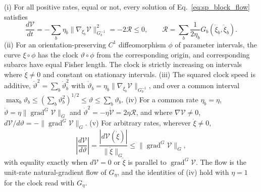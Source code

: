 \begin{proposition}\label{prop:sp_block_descent}
(i) For all positive rates, equal or not, every solution of Eq.~\eqref{eq:sp_block_flow} satisfies
\begin{equation}
\frac{d\mathcal V}{dt}=-\sum_b\eta_b\|\nabla_{\xi_b}\mathcal V\|_{G_b^{-1}}^2=-2\mathcal R\leq0,
\qquad
\mathcal R=\sum_b\frac{1}{2\eta_b}G_b(\dot\xi_b,\dot\xi_b).
\label{eq:sp_block_dissipation}
\end{equation}
(ii) For an orientation-preserving $C^1$ diffeomorphism $\phi$ of parameter intervals, the curve $\xi\circ\phi$ has the clock $\vartheta\circ\phi$ from the corresponding origin, and corresponding subarcs have equal Fisher length. The clock is strictly increasing on intervals where $\dot\xi\neq0$ and constant on stationary intervals.
(iii) The squared clock speed is additive, $\dot\vartheta^2=\sum_b\dot\vartheta_b^2$ with $\dot\vartheta_b=\eta_b\|\nabla_{\xi_b}\mathcal V\|_{G_b^{-1}}$, and over a common interval $\max_b\vartheta_b\leq(\sum_b\vartheta_b^2)^{1/2}\leq\vartheta\leq\sum_b\vartheta_b$.
(iv) For a common rate $\eta_b=\eta$, $\dot\vartheta=\eta\|\operatorname{grad}^G\mathcal V\|_G$ and $\dot\vartheta^2=-\eta\dot{\mathcal V}=2\eta\mathcal R$, and where $\nabla\mathcal V\neq0$, $d\mathcal V/d\vartheta=-\|\operatorname{grad}^G\mathcal V\|_G$.
(v) For arbitrary rates, wherever $\dot\xi\neq0$,
\begin{equation}
\left|\frac{d\mathcal V}{d\vartheta}\right|
=\frac{|d\mathcal V(\dot\xi)|}{\|\dot\xi\|_G}
\leq\|\operatorname{grad}^G\mathcal V\|_G,
\label{eq:sp_clock_bound}
\end{equation}
with equality exactly when $d\mathcal V=0$ or $\dot\xi$ is parallel to $\operatorname{grad}^G\mathcal V$. The flow is the unit-rate natural-gradient flow of $G_\eta$, and the identities of (iv) hold with $\eta=1$ for the clock read with $G_\eta$.
\end{proposition}
